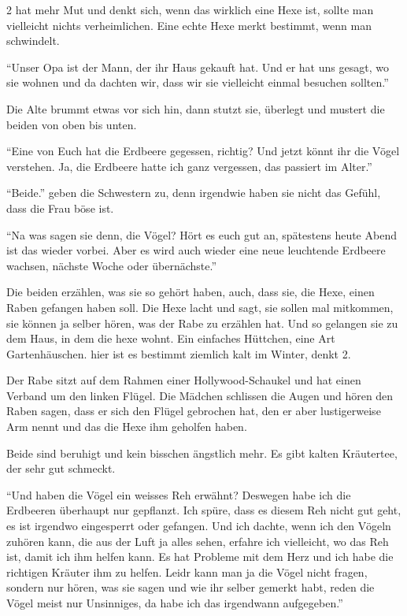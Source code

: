 \begin{mdframed}[style=mystyle]
2 hat mehr Mut und denkt sich, wenn das wirklich eine Hexe ist, sollte man vielleicht nichts verheimlichen. Eine echte Hexe merkt bestimmt, wenn man schwindelt.

\enquote{Unser Opa ist der Mann, der ihr Haus gekauft hat. Und er hat uns gesagt, wo sie wohnen und da dachten wir, dass wir sie vielleicht einmal besuchen sollten.}

Die Alte brummt etwas vor sich hin, dann stutzt sie, überlegt und mustert die beiden von oben bis unten.

\enquote{Eine von Euch hat die Erdbeere gegessen, richtig? Und jetzt könnt ihr die Vögel verstehen. Ja, die Erdbeere hatte ich ganz vergessen, das passiert im Alter.}

\enquote{Beide.} geben die Schwestern zu, denn irgendwie haben sie nicht das Gefühl, dass die Frau böse ist. 

\enquote{Na was sagen sie denn, die Vögel? Hört es euch gut an, spätestens heute Abend ist das wieder vorbei. Aber es wird auch wieder eine neue leuchtende Erdbeere wachsen, nächste Woche oder übernächste.} 

Die beiden erzählen, was sie so gehört haben, auch, dass sie, die Hexe, einen Raben gefangen haben soll. Die Hexe lacht und sagt, sie sollen mal mitkommen, sie können ja selber hören, was der Rabe zu erzählen hat. Und so gelangen sie zu dem Haus, in dem die hexe wohnt. Ein einfaches Hüttchen, eine Art Gartenhäuschen. hier ist es bestimmt ziemlich kalt im Winter, denkt 2. 

Der Rabe sitzt auf dem Rahmen einer Hollywood-Schaukel und hat einen Verband um den linken Flügel. Die Mädchen schlissen die Augen und hören den Raben sagen, dass er sich den Flügel gebrochen hat, den er aber lustigerweise Arm nennt und das die Hexe ihm geholfen haben.

Beide sind beruhigt und kein bisschen ängstlich mehr. Es gibt kalten Kräutertee, der sehr gut schmeckt. 

\enquote{Und haben die Vögel ein weisses Reh erwähnt? Deswegen habe ich die Erdbeeren überhaupt nur gepflanzt. Ich spüre, dass es diesem Reh nicht gut geht, es ist irgendwo eingesperrt oder gefangen. Und ich dachte, wenn ich den Vögeln zuhören kann, die aus der Luft ja alles sehen, erfahre ich vielleicht, wo das Reh ist, damit ich ihm helfen kann. Es hat Probleme mit dem Herz und ich habe die richtigen Kräuter ihm zu helfen. Leidr kann man ja die Vögel nicht fragen, sondern nur hören, was sie sagen und wie ihr selber gemerkt habt, reden die Vögel meist nur Unsinniges, da habe ich das irgendwann aufgegeben.}


\end{mdframed}

